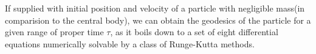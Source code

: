 \documentclass{aastex63}
\begin{document}
If supplied with initial position and velocity of a particle with negligible mass(in comparision to the central body), we can obtain the geodesics of the particle for a given range of proper time $\tau$, as it boils down to a set of eight differential equations numerically solvable by a class of Runge-Kutta methods.






\end{document}
